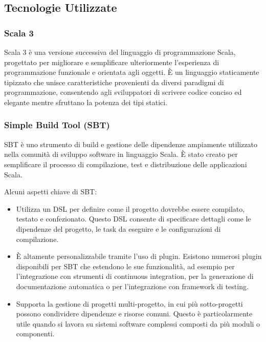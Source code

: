 \documentclass[12pt]{article}
\begin{document}
\subsection{Tecnologie Utilizzate}

\subsubsection{Scala 3}

Scala 3 è una versione successiva del linguaggio di programmazione Scala, progettato per migliorare e semplificare ulteriormente l'esperienza di programmazione funzionale e orientata agli oggetti. È un linguaggio staticamente tipizzato che unisce caratteristiche provenienti da diversi paradigmi di programmazione, consentendo agli sviluppatori di scrivere codice conciso ed elegante mentre sfruttano la potenza dei tipi statici.

\subsubsection{Simple Build Tool (SBT)}

SBT è uno strumento di build e gestione delle dipendenze ampiamente utilizzato nella comunità di sviluppo software in linguaggio Scala. È stato creato per semplificare il processo di compilazione, test e distribuzione delle applicazioni Scala.

Alcuni aspetti chiave di SBT:

\begin{itemize}
    \item Utilizza un DSL per definire come il progetto dovrebbe essere compilato, testato e confezionato. Questo DSL consente di specificare dettagli come le dipendenze del progetto, le task da eseguire e le configurazioni di compilazione.
    \item È altamente personalizzabile tramite l'uso di plugin. Esistono numerosi plugin disponibili per SBT che estendono le sue funzionalità, ad esempio per l'integrazione con strumenti di continuous integration, per la generazione di documentazione automatica o per l'integrazione con framework di testing.
    \item Supporta la gestione di progetti multi-progetto, in cui più sotto-progetti possono condividere dipendenze e risorse comuni. Questo è particolarmente utile quando si lavora su sistemi software complessi composti da più moduli o componenti.
\end{itemize}
\end{document}
